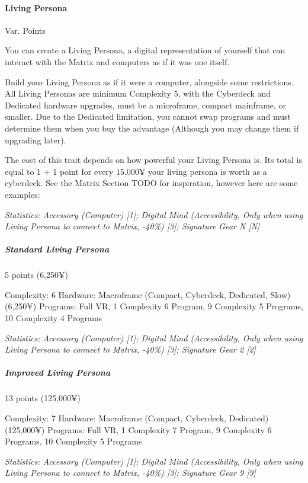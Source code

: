 \begin{multicols*}{3}
	\paragraph{Living Persona}
	\begin{flushright}
		Var. Points
	\end{flushright}
	
	You can create a Living Persona, a digital representation of yourself that can interact with the Matrix and computers as if it was one itself. 
	
	Build your Living Persona as if it were a computer, alongside some restrictions. All Living Personas are minimum Complexity 5, with the Cyberdeck and Dedicated hardware upgrades, must be a microframe, compact mainframe, or smaller. Due to the Dedicated limitation, you cannot swap programs and must determine them when you buy the advantage (Although you may change them if upgrading later).
	
	The cost of this trait depends on how powerful your Living Persona is. Its total is equal to 1 + 1 point for every 15,000¥ your living persona is worth as a cyberdeck. See the Matrix Section TODO for inspiration, however here are some examples:
	
	\textit{\textcolor{OliveGreen}{Statistics: Accessory (Computer) [1]; Digital Mind (Accessibility, Only when using Living Persona to connect to Matrix, -40\%) [3]; Signature Gear N [N]}}
	
	\subparagraph{Standard Living Persona}
	\begin{flushright}5 points (6,250¥)\end{flushright}
	
	Complexity: 6
	Hardware: Macroframe (Compact, Cyberdeck, Dedicated, Slow) (6,250¥)
	Programs: Full VR, 1 Complexity 6 Program, 9 Complexity 5 Programs, 10 Complexity 4 Programs
	
	\textit{\textcolor{OliveGreen}{Statistics: Accessory (Computer) [1]; Digital Mind (Accessibility, Only when using Living Persona to connect to Matrix, -40\%) [3]; Signature Gear 2 [2]}}
	
	\subparagraph{Improved Living Persona}
	\begin{flushright}13 points (125,000¥)\end{flushright}
	
	Complexity: 7
	Hardware: Macroframe (Compact, Cyberdeck, Dedicated) (125,000¥)
	Programs: Full VR, 1 Complexity 7 Program, 9 Complexity 6 Programs, 10 Complexity 5 Programs
	
	\textit{\textcolor{OliveGreen}{Statistics: Accessory (Computer) [1]; Digital Mind (Accessibility, Only when using Living Persona to connect to Matrix, -40\%) [3]; Signature Gear 9 [9]}}
	

\end{multicols*}

